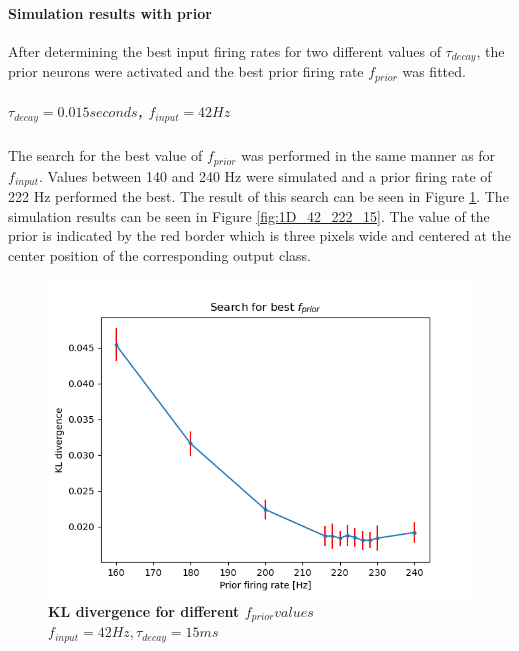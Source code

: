 \paragraph{Simulation results with prior}
After determining the best input firing rates for two different values of $\tau_{decay}$, the prior neurons were activated and the best prior firing rate $f_{prior}$ was fitted.
\subparagraph{$\tau_{decay} = 0.015 seconds$, $f_{input} = 42 Hz$}
The search for the best value of $f_{prior}$ was performed in the same manner as for $f_{input}$. Values between 140 and 240 Hz were simulated and a prior firing rate of 222 Hz performed the best. The result of this search can be seen in Figure \ref{fig:1D_KLD_fInput42_tau15}. The simulation results can be seen in Figure \ref{fig:1D_42_222_15}. The value of the prior is indicated by the red border which is three pixels wide and centered at the center position of the corresponding output class.

\begin{figure}
  \includegraphics[width=\linewidth]{figures/1D/KLDvsfPrior_fInput42tau15.png}
  \caption{\textbf{KL divergence for different $f_{prior} values$} $f_{input} = 42 Hz, \tau_{decay} = 15 ms$}
  \label{fig:1D_KLD_fInput42_tau15}
\end{figure}

